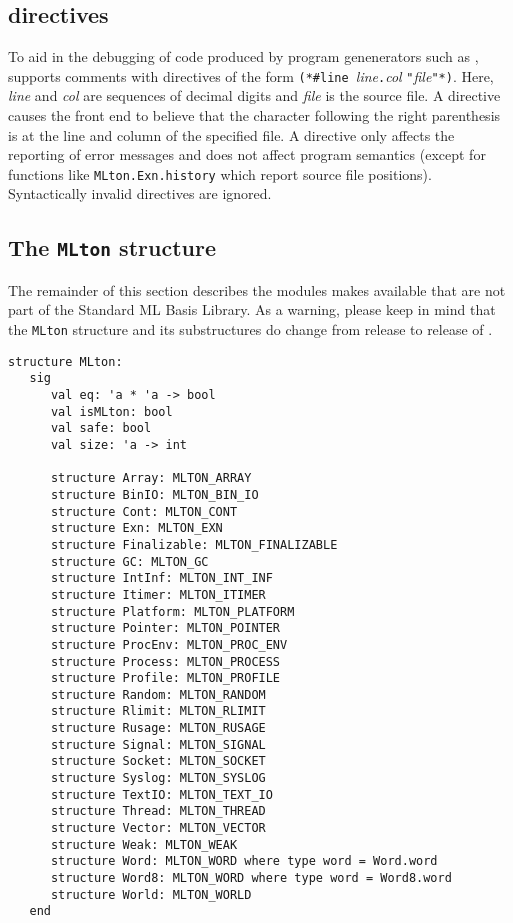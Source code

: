 %
\subsection{{\nline} directives}

To aid in the debugging of code produced by program genenerators such as
,
{\mlton} supports comments with {\nline} directives of the form {\tt (*\#line
}{\it line}{\tt.}{\it col} {\tt "}{\it file}{\tt"*)}.  Here, {\it line} and {\it
col} are sequences of decimal digits and {\it file} is the source file.  A
{\nline} directive causes the front end to believe that the character following
the right parenthesis is at the line and column of the specified file.  A
{\nline} directive only affects the reporting of error messages and does not
affect program semantics (except for functions like {\tt MLton.Exn.history}
which report source file positions).  Syntactically invalid {\nline} directives
are ignored.
%
\subsection{The {\tt MLton} structure}

The remainder of this section describes the modules {\mlton} makes
available that are not part of the Standard ML Basis Library.  As a
warning, please keep in mind that the {\tt MLton} structure and its
substructures do change from release to release of {\mlton}.

\begin{verbatim}
structure MLton:
   sig
      val eq: 'a * 'a -> bool
      val isMLton: bool
      val safe: bool
      val size: 'a -> int

      structure Array: MLTON_ARRAY
      structure BinIO: MLTON_BIN_IO
      structure Cont: MLTON_CONT
      structure Exn: MLTON_EXN
      structure Finalizable: MLTON_FINALIZABLE
      structure GC: MLTON_GC
      structure IntInf: MLTON_INT_INF
      structure Itimer: MLTON_ITIMER
      structure Platform: MLTON_PLATFORM
      structure Pointer: MLTON_POINTER
      structure ProcEnv: MLTON_PROC_ENV
      structure Process: MLTON_PROCESS
      structure Profile: MLTON_PROFILE
      structure Random: MLTON_RANDOM
      structure Rlimit: MLTON_RLIMIT
      structure Rusage: MLTON_RUSAGE
      structure Signal: MLTON_SIGNAL
      structure Socket: MLTON_SOCKET
      structure Syslog: MLTON_SYSLOG
      structure TextIO: MLTON_TEXT_IO
      structure Thread: MLTON_THREAD
      structure Vector: MLTON_VECTOR
      structure Weak: MLTON_WEAK
      structure Word: MLTON_WORD where type word = Word.word
      structure Word8: MLTON_WORD where type word = Word8.word
      structure World: MLTON_WORLD
   end
\end{verbatim}
%
